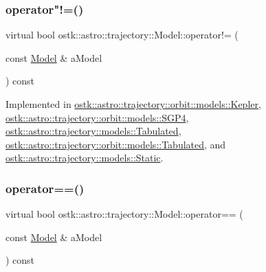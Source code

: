 \subsubsection{\texorpdfstring{operator"!=()}{operator!=()}}
{\footnotesize\ttfamily virtual bool ostk\+::astro\+::trajectory\+::\+Model\+::operator!= (\begin{DoxyParamCaption}\item[{const \hyperlink{classostk_1_1astro_1_1trajectory_1_1_model}{Model} \&}]{a\+Model }\end{DoxyParamCaption}) const\hspace{0.3cm}{\ttfamily [pure virtual]}}



Implemented in \hyperlink{classostk_1_1astro_1_1trajectory_1_1orbit_1_1models_1_1_kepler_ab343575a423c5cecea4b21fa79c80726}{ostk\+::astro\+::trajectory\+::orbit\+::models\+::\+Kepler}, \hyperlink{classostk_1_1astro_1_1trajectory_1_1orbit_1_1models_1_1_s_g_p4_a87441104e4e1c63356abe0632b56edb6}{ostk\+::astro\+::trajectory\+::orbit\+::models\+::\+S\+G\+P4}, \hyperlink{classostk_1_1astro_1_1trajectory_1_1models_1_1_tabulated_a5e047165eb79ea50d257c2cb1bafc30d}{ostk\+::astro\+::trajectory\+::models\+::\+Tabulated}, \hyperlink{classostk_1_1astro_1_1trajectory_1_1orbit_1_1models_1_1_tabulated_a17610dc24fefecd03ae595cc78ef3079}{ostk\+::astro\+::trajectory\+::orbit\+::models\+::\+Tabulated}, and \hyperlink{classostk_1_1astro_1_1trajectory_1_1models_1_1_static_af85efc113db69c75c1afc7db0e81297b}{ostk\+::astro\+::trajectory\+::models\+::\+Static}.

\mbox{\label{classostk_1_1astro_1_1trajectory_1_1_model_a874f79846e845859c070ce1b9874fc9c}} 
\subsubsection{\texorpdfstring{operator==()}{operator==()}}
{\footnotesize\ttfamily virtual bool ostk\+::astro\+::trajectory\+::\+Model\+::operator== (\begin{DoxyParamCaption}\item[{const \hyperlink{classostk_1_1astro_1_1trajectory_1_1_model}{Model} \&}]{a\+Model }\end{DoxyParamCaption}) const\hspace{0.3cm}{\ttfamily [pure virtual]}}



